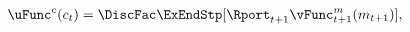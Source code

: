   \begin{equation}\begin{gathered}\begin{aligned}
        \uFunc^{c}(c_{t})  & = \DiscFac \ExEndStp [{\Rport}_{t+1} \vFunc^{m}_{t+1}(m_{t+1})] \label{eq:valfuncFOCRtilde},
      \end{aligned}\end{gathered}\end{equation}
